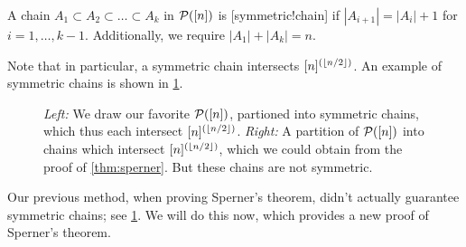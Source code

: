 \begin{definition}
A chain $A_1 \subset A_2 \subset \dotsc \subset A_k$ in $\P([n])$ is [symmetric!chain] if $|A_{i+1}| = |A_i| +1$ for $i=1,\dotsc,k-1$. Additionally, we require $|A_1| + |A_k| = n$. 
\end{definition}
Note that in particular, a symmetric chain  intersects $[n]^{(\floor{n/2})}$. An example of symmetric chains is shown in \cref{fig:sym_chains}.
\begin{figure}[ht]
\begin{center}
\end{center}
\caption{\textit{Left:} We draw our favorite $\P([n])$, partioned into symmetric chains, which thus each intersect $[n]^{(\floor{n/2})}$. \textit{Right:} A partition of $\P([n])$ into chains which intersect $[n]^{(\floor{n/2})}$, which we could obtain from the proof of \cref{thm:sperner}. But these chains are not symmetric.} \label{fig:sym_chains} 
\end{figure}

Our previous method, when proving Sperner's theorem, didn't actually guarantee symmetric chains; see \cref{fig:sym_chains}. We will do this now, which provides a new proof of Sperner's theorem.


